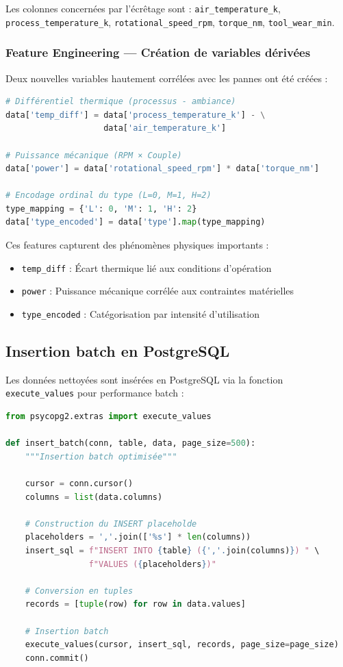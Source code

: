 \documentclass[a4paper,12pt,twoside]{report}
\begin{document}
Les colonnes concernées par l'écrêtage sont : \texttt{air\_temperature\_k}, \texttt{process\_temperature\_k}, \texttt{rotational\_speed\_rpm}, \texttt{torque\_nm}, \texttt{tool\_wear\_min}.

\subsubsection{Feature Engineering — Création de variables dérivées}

Deux nouvelles variables hautement corrélées avec les pannes ont été créées :

\begin{lstlisting}[language=Python]
# Différentiel thermique (processus - ambiance)
data['temp_diff'] = data['process_temperature_k'] - \
                    data['air_temperature_k']

# Puissance mécanique (RPM × Couple)
data['power'] = data['rotational_speed_rpm'] * data['torque_nm']

# Encodage ordinal du type (L=0, M=1, H=2)
type_mapping = {'L': 0, 'M': 1, 'H': 2}
data['type_encoded'] = data['type'].map(type_mapping)
\end{lstlisting}

Ces features capturent des phénomènes physiques importants :
\begin{itemize}
    \item \texttt{temp\_diff} : Écart thermique lié aux conditions d'opération
    \item \texttt{power} : Puissance mécanique corrélée aux contraintes matérielles
    \item \texttt{type\_encoded} : Catégorisation par intensité d'utilisation
\end{itemize}

\subsection{Insertion batch en PostgreSQL}

Les données nettoyées sont insérées en PostgreSQL via la fonction \texttt{execute\_values} pour performance batch :

\begin{lstlisting}[language=Python]
from psycopg2.extras import execute_values

def insert_batch(conn, table, data, page_size=500):
    """Insertion batch optimisée"""
    
    cursor = conn.cursor()
    columns = list(data.columns)
    
    # Construction du INSERT placeholde
    placeholders = ','.join(['%s'] * len(columns))
    insert_sql = f"INSERT INTO {table} ({','.join(columns)}) " \
                 f"VALUES ({placeholders})"
    
    # Conversion en tuples
    records = [tuple(row) for row in data.values]
    
    # Insertion batch
    execute_values(cursor, insert_sql, records, page_size=page_size)
    conn.commit()
\end{lstlisting}
\end{document}
